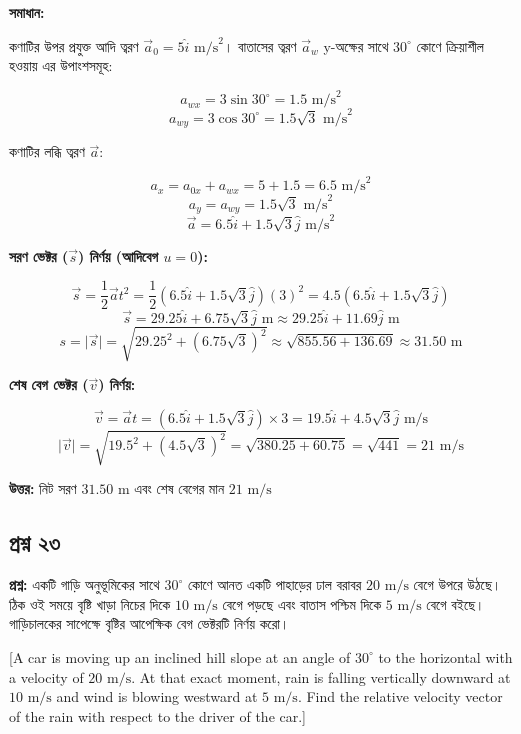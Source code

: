 \documentclass{article}
\begin{document}
\textbf{সমাধান:}

কণাটির উপর প্রযুক্ত আদি ত্বরণ $\vec{a}_0 = 5\hat{i}\text{ m/s}^2$। বাতাসের ত্বরণ $\vec{a}_w$ y-অক্ষের সাথে $30^\circ$ কোণে ক্রিয়াশীল হওয়ায় এর উপাংশসমূহ:

$$a_{wx} = 3\sin 30^\circ = 1.5\text{ m/s}^2$$
$$a_{wy} = 3\cos 30^\circ = 1.5\sqrt{3}\text{ m/s}^2$$

কণাটির লব্ধি ত্বরণ $\vec{a}$:

$$a_x = a_{0x} + a_{wx} = 5 + 1.5 = 6.5\text{ m/s}^2$$
$$a_y = a_{wy} = 1.5\sqrt{3}\text{ m/s}^2$$
$$\vec{a} = 6.5\hat{i} + 1.5\sqrt{3}\hat{j}\text{ m/s}^2$$

\textbf{সরণ ভেক্টর ($\vec{s}$) নির্ণয় (আদিবেগ $u = 0$):}

$$\vec{s} = \frac{1}{2}\vec{a}t^2 = \frac{1}{2}(6.5\hat{i} + 1.5\sqrt{3}\hat{j})(3)^2 = 4.5(6.5\hat{i} + 1.5\sqrt{3}\hat{j})$$
$$\vec{s} = 29.25\hat{i} + 6.75\sqrt{3}\hat{j}\text{ m} \approx 29.25\hat{i} + 11.69\hat{j}\text{ m}$$
$$s = \vert{}\vec{s}\vert{} = \sqrt{29.25^2 + (6.75\sqrt{3})^2} \approx \sqrt{855.56 + 136.69} \approx 31.50\text{ m}$$

\textbf{শেষ বেগ ভেক্টর ($\vec{v}$) নির্ণয়:}

$$\vec{v} = \vec{a}t = (6.5\hat{i} + 1.5\sqrt{3}\hat{j}) \times 3 = 19.5\hat{i} + 4.5\sqrt{3}\hat{j}\text{ m/s}$$
$$\vert{}\vec{v}\vert{} = \sqrt{19.5^2 + (4.5\sqrt{3})^2} = \sqrt{380.25 + 60.75} = \sqrt{441} = 21\text{ m/s}$$

\textbf{উত্তর:} নিট সরণ $31.50\text{ m}$ এবং শেষ বেগের মান $21\text{ m/s}$

\hrulefill

\subsection*{প্রশ্ন ২৩}
\textbf{প্রশ্ন:} একটি গাড়ি অনুভূমিকের সাথে $30^\circ$ কোণে আনত একটি পাহাড়ের ঢাল বরাবর $20\text{ m/s}$ বেগে উপরে উঠছে। ঠিক ওই সময়ে বৃষ্টি খাড়া নিচের দিকে $10\text{ m/s}$ বেগে পড়ছে এবং বাতাস পশ্চিম দিকে $5\text{ m/s}$ বেগে বইছে। গাড়িচালকের সাপেক্ষে বৃষ্টির আপেক্ষিক বেগ ভেক্টরটি নির্ণয় করো।

[A car is moving up an inclined hill slope at an angle of $30^\circ$ to the horizontal with a velocity of $20\text{ m/s}$. At that exact moment, rain is falling vertically downward at $10\text{ m/s}$ and wind is blowing westward at $5\text{ m/s}$. Find the relative velocity vector of the rain with respect to the driver of the car.]
\end{document}
